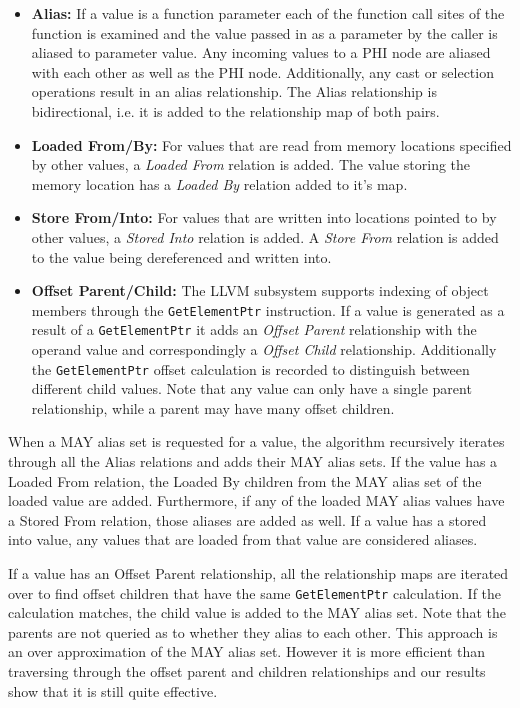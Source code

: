 \documentclass[preprint]{sigplanconf}
\begin{document}
\begin{itemize}

    \item {\bf Alias:} If a value is a function parameter each of the function call sites of the function is examined and the value passed in as a parameter by the caller is aliased to parameter value. Any incoming values to a PHI node are aliased with each other as well as the PHI node. Additionally, any cast or selection operations result in an alias relationship. The Alias relationship is bidirectional, i.e. it is added to the relationship map of both pairs.

    \item {\bf Loaded From/By:} For values that are read from memory locations specified by other values, a \emph{Loaded From} relation is added. The value storing the memory location has a \emph{Loaded By} relation added to it's map.

    \item {\bf Store From/Into:} For values that are written into locations pointed to by other values, a \emph{Stored Into} relation is added. A \emph{Store From} relation is added to the value being dereferenced and written into.

    \item {\bf Offset Parent/Child:} The LLVM subsystem supports indexing of object members through the \verb+GetElementPtr+ instruction. If a value is generated as a result of a \verb+GetElementPtr+ it adds an \emph{Offset Parent} relationship with the operand value and correspondingly a \emph{Offset Child} relationship. Additionally the \verb+GetElementPtr+ offset calculation is recorded to distinguish between different child values. Note that any value can only have a single parent relationship, while a parent may have many offset children.

\end{itemize}

When a MAY alias set is requested for a value, the algorithm recursively iterates through all the Alias relations and adds their MAY alias sets. If the value has a Loaded From relation, the Loaded By children from the MAY alias set of the loaded value are added. Furthermore, if any of the loaded MAY alias values have a Stored From relation, those aliases are added as well. If a value has a stored into value, any values that are loaded from that value are considered aliases.

If a value has an Offset Parent relationship, all the relationship maps are iterated over to find offset children that have the same \verb+GetElementPtr+ calculation. If the calculation matches, the child value is added to the MAY alias set. Note that the parents are not queried as to whether they alias to each other. This approach is an over approximation of the MAY alias set. However it is more efficient than traversing through the offset parent and children relationships and our results show that it is still quite effective.
\end{document}
